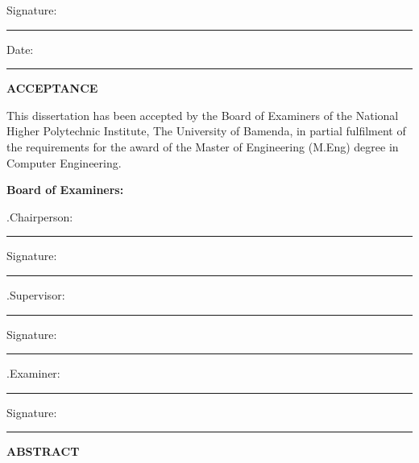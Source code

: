 \documentclass[12pt,a4paper]{report}
\begin{document}
\vspace{3cm}

\noindent Signature: \rule{6cm}{0.4pt}

\vspace{1cm}

\noindent Date: \rule{6cm}{0.4pt}

\clearpage
\begin{center}
{\Large\bfseries ACCEPTANCE}
\end{center}
\vspace{1cm}

This dissertation has been accepted by the Board of Examiners of the National Higher Polytechnic Institute, The University of Bamenda, in partial fulfilment of the requirements for the award of the Master of Engineering (M.Eng) degree in Computer Engineering.

\vspace{2cm}

\noindent\textbf{Board of Examiners:}
\vspace{1.5cm}

.\quad Chairperson: \rule{5cm}{0.4pt}\hfill Signature: \rule{3.2cm}{0.4pt}
\vspace{1.4cm}

.\quad Supervisor: \rule{5.2cm}{0.4pt}\hfill Signature: \rule{3.2cm}{0.4pt}
\vspace{1.4cm}

.\quad Examiner: \rule{5.5cm}{0.4pt}\hfill Signature: \rule{3.2cm}{0.4pt}

\clearpage
\begin{center}
{\Large\bfseries ABSTRACT}
\end{center}
\vspace{1cm}
\end{document}
